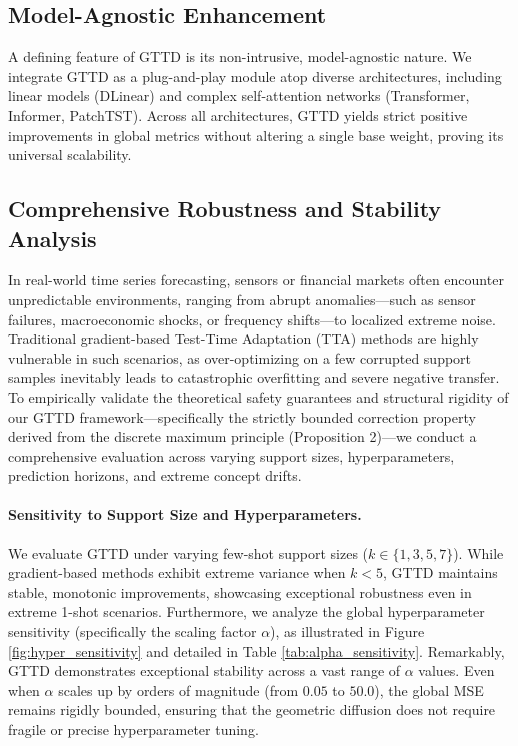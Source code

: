 \documentclass{article}
\begin{document}
\subsection{Model-Agnostic Enhancement}

A defining feature of GTTD is its non-intrusive, model-agnostic nature. We integrate GTTD as a plug-and-play module atop diverse architectures, including linear models (DLinear) and complex self-attention networks (Transformer, Informer, PatchTST). Across all architectures, GTTD yields strict positive improvements in global metrics without altering a single base weight, proving its universal scalability.

\subsection{Comprehensive Robustness and Stability Analysis}

In real-world time series forecasting, sensors or financial markets often encounter unpredictable environments, ranging from abrupt anomalies---such as sensor failures, macroeconomic shocks, or frequency shifts---to localized extreme noise. Traditional gradient-based Test-Time Adaptation (TTA) methods are highly vulnerable in such scenarios, as over-optimizing on a few corrupted support samples inevitably leads to catastrophic overfitting and severe negative transfer. To empirically validate the theoretical safety guarantees and structural rigidity of our GTTD framework---specifically the strictly bounded correction property derived from the discrete maximum principle (Proposition 2)---we conduct a comprehensive evaluation across varying support sizes, hyperparameters, prediction horizons, and extreme concept drifts.

\paragraph{Sensitivity to Support Size and Hyperparameters.} We evaluate GTTD under varying few-shot support sizes ($k \in \{1, 3, 5, 7\}$). While gradient-based methods exhibit extreme variance when $k < 5$, GTTD maintains stable, monotonic improvements, showcasing exceptional robustness even in extreme 1-shot scenarios. Furthermore, we analyze the global hyperparameter sensitivity (specifically the scaling factor $\alpha$), as illustrated in Figure \ref{fig:hyper_sensitivity} and detailed in Table \ref{tab:alpha_sensitivity}. Remarkably, GTTD demonstrates exceptional stability across a vast range of $\alpha$ values. Even when $\alpha$ scales up by orders of magnitude (from $0.05$ to $50.0$), the global MSE remains rigidly bounded, ensuring that the geometric diffusion does not require fragile or precise hyperparameter tuning.
\end{document}
